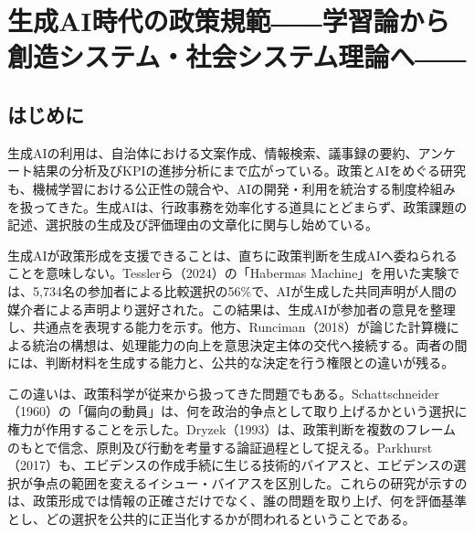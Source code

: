 
\chapter{生成AI時代の政策規範――学習論から創造システム・社会システム理論へ――}
\label{chap:literature_review}

\section{はじめに}

生成AIの利用は、自治体における文案作成、情報検索、議事録の要約、アンケート結果の分析及びKPIの進捗分析にまで広がっている\cite{soumu2022ai}。政策とAIをめぐる研究も、機械学習における公正性の競合\cite{barocas2019fairness}や、AIの開発・利用を統治する制度枠組み\cite{kozuka2019governance}を扱ってきた。生成AIは、行政事務を効率化する道具にとどまらず、政策課題の記述、選択肢の生成及び評価理由の文章化に関与し始めている。

生成AIが政策形成を支援できることは、直ちに政策判断を生成AIへ委ねられることを意味しない。Tesslerら（2024）の「Habermas Machine」を用いた実験では、5,734名の参加者による比較選択の56\%で、AIが生成した共同声明が人間の媒介者による声明より選好された\cite{tessler2024ai}。この結果は、生成AIが参加者の意見を整理し、共通点を表現する能力を示す。他方、Runciman（2018）が論じた計算機による統治の構想は、処理能力の向上を意思決定主体の交代へ接続する\cite{runciman2018democracy}。両者の間には、判断材料を生成する能力と、公共的な決定を行う権限との違いが残る。

この違いは、政策科学が従来から扱ってきた問題でもある。Schattschneider（1960）の「偏向の動員」は、何を政治的争点として取り上げるかという選択に権力が作用することを示した\cite{schattschneider1960semisovereign}。Dryzek（1993）は、政策判断を複数のフレームのもとで信念、原則及び行動を考量する論証過程として捉える\cite{dryzek1993policy}。Parkhurst（2017）も、エビデンスの作成手続に生じる技術的バイアスと、エビデンスの選択が争点の範囲を変えるイシュー・バイアスを区別した\cite{parkhurst2017politics}。これらの研究が示すのは、政策形成では情報の正確さだけでなく、誰の問題を取り上げ、何を評価基準とし、どの選択を公共的に正当化するかが問われるということである。


